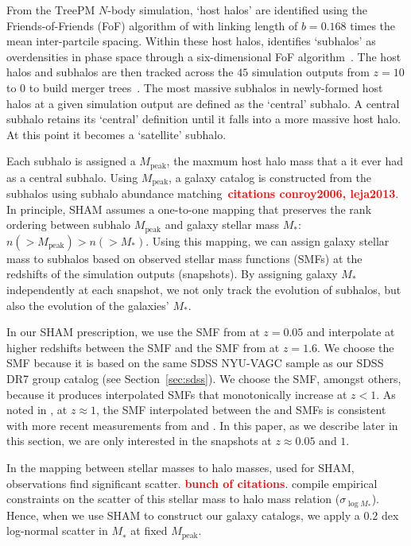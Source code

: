 \documentclass[12pt, letterpaper, preprint]{aastex}
\newcommand{\todo}[1]{{\bf \textcolor{red}{#1}}}
\begin{document}
From the $\mathrm{TreePM}$ $N$-body simulation, `host halos' are identified using the
Friends-of-Friends (FoF) algorithm of \cite{davis1985} with linking length of $b = 0.168$
times the mean inter-partcile spacing. Within these host halos, \cite{wetzel2013} identifies  
`subhalos' as overdensities in phase space through a six-dimensional FoF 
algorithm~\citep[FoF6D][]{white2010}. The host halos and subhalos are then tracked across 
the $45$ simulation outputs from $z = 10$ to $0$ to build merger trees~\citep{wetzel2009,wetzel2010}. 
The most massive subhalos in newly-formed host halos at a given simulation output are defined 
as the `central' subhalo. A central subhalo retains its `central' definition until it falls into 
a more massive host halo. At this point it becomes a `satellite' subhalo. 

Each subhalo is assigned a $M_\mathrm{peak}$, the maxmum host halo mass that a it ever had 
as a central subhalo. Using $M_\mathrm{peak}$, a galaxy catalog is constructed from 
the subhalos using subhalo abundance matching~\citep[SHAM;][]{vale2006,yang2009,wetzel2012,wetzel2013,wetzel2014,hahn2017a}\todo{citations conroy2006, leja2013}. 
In principle, SHAM assumes a one-to-one mapping that preserves the rank ordering between subhalo $M_\mathrm{peak}$
and galaxy stellar mass $M_*$: $n(> M_\mathrm{peak}) > n(> M_*)$. Using this mapping, we can 
assign galaxy stellar mass to subhalos based on observed stellar mass functions (SMFs) at the
redshifts of the simulation outputs (snapshots). By assigning galaxy $M_*$ independently at each 
snapshot, we not only track the evolution of subhalos, but also the evolution of the galaxies' $M_*$. 

In our SHAM prescription, we use the SMF from \cite{li2009} at $z = 0.05$ and interpolate at
higher redshifts between the \cite{li2009} SMF and the SMF from \cite{marchesini2009} at 
$z = 1.6$. We choose the \cite{li2009} SMF because it is based on the same SDSS NYU-VAGC 
sample as our SDSS DR7 group catalog (see Section~\ref{sec:sdss}). We choose the 
\cite{marchesini2009} SMF, amongst others, because it produces interpolated SMFs that
monotonically increase at $z < 1$. As noted in \cite{hahn2017}, 
at $z \approx 1$, the SMF interpolated between the \cite{li2009} and \cite{marchesini2009} 
SMFs is consistent with more recent measurements from \cite{muzzin2013} and \cite{ilbert2013}. 
In this paper, as we describe later in this section, we are only interested in the snapshots 
at $z \approx 0.05$ and $1$.

In the mapping between stellar masses to halo masses, used for SHAM, observations find 
significant scatter. 
\todo{bunch of citations}. \cite{gu2016} compile empirical constraints on the scatter of 
this stellar mass to halo mass relation ($\sigma_{\log M_*}$). 
Hence, when we use SHAM to construct our galaxy catalogs, we apply a $0.2$ dex log-normal 
scatter in $M_∗$ at fixed $M_\mathrm{peak}$. 
\end{document}
